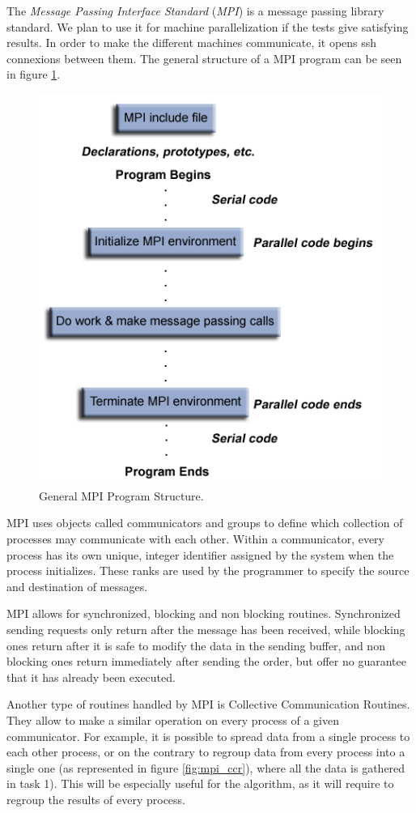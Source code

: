 The \emph{Message Passing Interface Standard} (\emph{MPI}) is a message passing library standard.
We plan to use it for machine parallelization if the tests give satisfying results.
In order to make the different machines communicate, it opens ssh connexions between them.
The general structure of a MPI program can be seen in figure \ref{fig:mpi_struct}.

\begin{figure}[H]
\centering
\includegraphics[width=.5\textwidth]{Parallelisation/Cluster/Img/prog_structure.png}
\caption{General MPI Program Structure. \cite{mpi_tuto}}
\label{fig:mpi_struct}
\end{figure}

MPI uses objects called communicators and groups to define which collection of processes may communicate with each other.
Within a communicator, every process has its own unique, integer identifier assigned by the system when the process initializes.
These ranks are used by the programmer to specify the source and destination of messages.

MPI allows for synchronized, blocking and non blocking routines.
Synchronized sending requests only return after the message has been received, while blocking ones return after it is safe to modify the data in the sending buffer, and non blocking ones return immediately after sending the order, but offer no guarantee that it has already been executed.

Another type of routines handled by MPI is Collective Communication Routines.
They allow to make a similar operation on every process of a given communicator.
For example, it is possible to spread data from a single process to each other process, or on the contrary to regroup data from every process into a single one (as represented in figure \ref{fig:mpi_ccr}), where all the data is gathered in task 1).
This will be especially useful for the algorithm, as it will require to regroup the results of every process.


